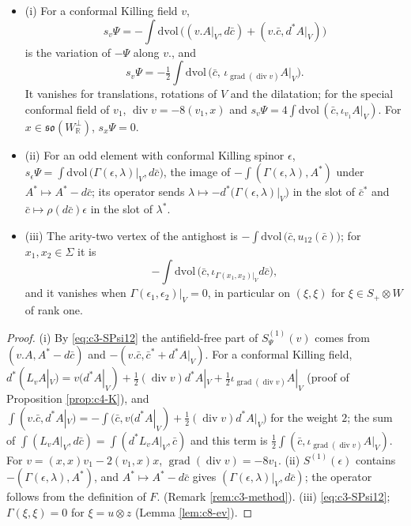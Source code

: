 \begin{proposition}
\label{prop:c3-sxpsi}
\begin{itemize}
\item (i) For a conformal Killing field $v$,
\[
s_v\Psi=-\int\mathrm{dvol}\,\big((v.A|_V,d\bar c)+(v.\bar c,d^*A|_V)\big)
\]
is the variation of $-\Psi$ along $v.$, and
\[
s_v\Psi=-\tfrac12\int\mathrm{dvol}\,\big(\bar c,\,\iota_{\operatorname{grad}(\operatorname{div}v)}A|_V\big).
\]
It vanishes for translations, rotations of $V$ and the dilatation; for the special conformal field of $v_1$, $\operatorname{div}v=-8(v_1,x)$ and $s_v\Psi=4\int\mathrm{dvol}\,(\bar c,\iota_{v_1}A|_V)$. For $x\in\mathfrak{so}(W_{\mathbb R}^\perp)$, $s_x\Psi=0$.
\item (ii) For an odd element with conformal Killing spinor $\epsilon$, $s_\epsilon\Psi=\int\mathrm{dvol}\,\big(\Gamma(\epsilon,\lambda)|_V,d\bar c\big)$, the image of $-\int(\Gamma(\epsilon,\lambda),A^*)$ under $A^*\mapsto A^*-d\bar c$; its operator sends $\lambda\mapsto-d^*\big(\Gamma(\epsilon,\lambda)|_V\big)$ in the slot of $\bar c^*$ and $\bar c\mapsto\rho(d\bar c)\epsilon$ in the slot of $\lambda^*$.
\item (iii) The arity-two vertex of the antighost is $-\int\mathrm{dvol}\,\big(\bar c,u_{12}(\bar c)\big)$; for $x_1,x_2\in\Sigma$ it is
\[
-\int\mathrm{dvol}\,\big(\bar c,\iota_{\Gamma(x_1,x_2)|_V}d\bar c\big),
\]
and it vanishes when $\Gamma(\epsilon_1,\epsilon_2)|_V=0$, in particular on $(\xi,\xi)$ for $\xi\in S_+\otimes W$ of rank one.
\end{itemize}
\end{proposition}

\begin{proof}
(i) By \eqref{eq:c3-SPsi12} the antifield-free part of $S^{(1)}_\Psi(v)$ comes from $(v.A,A^*-d\bar c)$ and $-(v.\bar c,\bar c^*+d^*A|_V)$. For a conformal Killing field, $d^*(L_vA|_V)=v(d^*A|_V)+\tfrac12(\operatorname{div}v)d^*A|_V+\tfrac12\iota_{\operatorname{grad}(\operatorname{div}v)}A|_V$ (proof of Proposition \ref{prop:c4-K}), and $\int(v.\bar c,d^*A|_V)=-\int\big(\bar c,v(d^*A|_V)+\tfrac12(\operatorname{div}v)d^*A|_V\big)$ for the weight $2$; the sum of $\int(L_vA|_V,d\bar c)=\int(d^*L_vA|_V,\bar c)$ and this term is $\tfrac12\int(\bar c,\iota_{\operatorname{grad}(\operatorname{div}v)}A|_V)$. For $v=(x,x)v_1-2(v_1,x)x$, $\operatorname{grad}(\operatorname{div}v)=-8v_1$. (ii) $S^{(1)}(\epsilon)$ contains $-(\Gamma(\epsilon,\lambda),A^*)$, and $A^*\mapsto A^*-d\bar c$ gives $(\Gamma(\epsilon,\lambda)|_V,d\bar c)$; the operator follows from the definition of $F.$ (Remark \ref{rem:c3-method}). (iii) \eqref{eq:c3-SPsi12}; $\Gamma(\xi,\xi)=0$ for $\xi=u\otimes z$ (Lemma \ref{lem:c8-ev}).
\end{proof}

